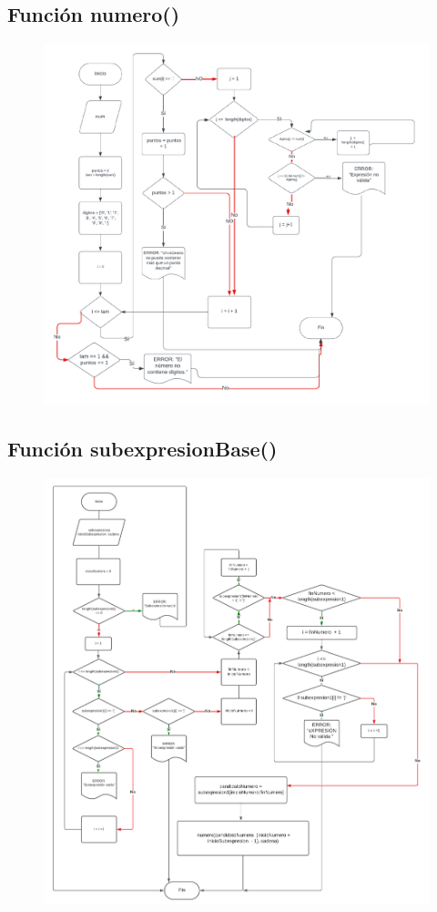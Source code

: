 \documentclass{article}
\begin{document}
\subsection{Función numero()}
\begin{figure}[h] 
	\centering 	\includegraphics[width=1.25\linewidth]{Función numero.png}
	\label{fig:Gráfica 3}
\end{figure}

\pagebreak
\subsection{Función subexpresionBase()}
\begin{figure}[h] 
	\centering 	\includegraphics[width=1.09\linewidth]{Función subexpresionBase.png}
	\label{fig:Gráfica 3}
\end{figure}
\end{document}
